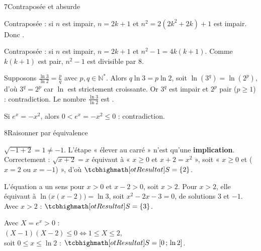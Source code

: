 \begin{deuxcolonnes}
\begin{corrige}{7}{Contraposée et absurde}
\begin{questions}
  \item Contraposée : si $n$ est impair, $n=2k+1$ et $n^{2}=2(2k^{2}+2k)+1$ est impair. Donc .
  \item Contraposée : si $n$ est impair, $n=2k+1$ et $n^{2}-1=4k(k+1)$. Comme $k(k+1)$ est pair, $n^{2}-1$ est divisible par $8$.
  \item Supposons $\frac{\ln3}{\ln2}=\frac pq$ avec $p,q\in\mathbb{N}^{*}$. Alors $q\ln3=p\ln2$, soit $\ln\left(3^{q}\right)=\ln\left(2^{p}\right)$,
    d'où $3^{q}=2^{p}$ car $\ln$ est strictement croissante. Or $3^{q}$ est impair et $2^{p}$ pair ($p\geq1$) : contradiction.
    Le nombre $\frac{\ln3}{\ln2}$ est .
  \item Si $e^{x}=-x^{2}$, alors $0<e^{x}=-x^{2}\leq0$ : contradiction. 
\end{questions}
\end{corrige}

\begin{corrige}{8}{Raisonner par équivalence}
\begin{questions}
  \item $\sqrt{-1+2}=1\neq-1$. L'étape « élever au carré » n'est qu'une \textbf{implication}. Correctement :
    $\sqrt{x+2}=x$ équivaut à « $x\geq0$ et $x+2=x^{2}$ », soit « $x\geq0$ et ($x=2$ ou $x=-1$) », d'où $\res{S=\ens2}$.
  \item L'équation a un sens pour $x>0$ et $x-2>0$, soit $x>2$. Pour $x>2$, elle équivaut à $\ln\big(x(x-2)\big)=\ln3$, soit
    $x^{2}-2x-3=0$, de solutions $3$ et $-1$. Avec $x>2$ : $\res{S=\ens3}$.
  \item Avec $X=e^{x}>0$ :\\ $(X-1)(X-2)\leq0\iff1\leq X\leq2$,\\ soit $0\leq x\leq\ln2$ : $\res{S=\intFF{0}{\ln2}}$.
\end{questions}
\end{corrige}


\end{deuxcolonnes}
